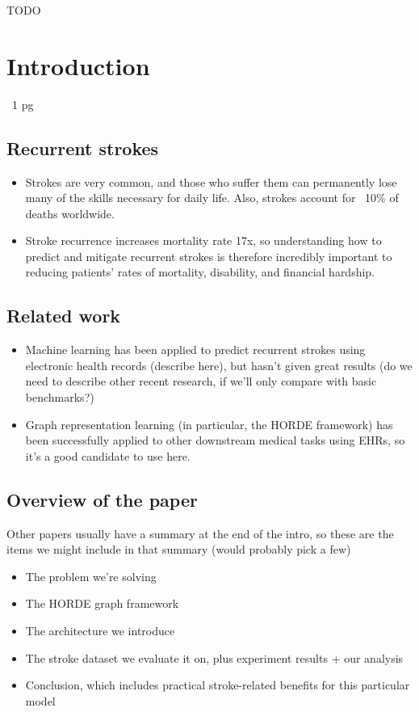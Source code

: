 \documentclass[conference]{IEEEtran}
\begin{document}
\begin{IEEEkeywords}
TODO
\end{IEEEkeywords}

\section{Introduction}
~1 pg
\subsection{Recurrent strokes}
\begin{itemize}
    \item Strokes are very common, and those who suffer them can permanently lose many of the skills necessary for daily life. Also, strokes account for ~10\% of deaths worldwide.
    \item Stroke recurrence increases mortality rate 17x, so understanding how to predict and mitigate recurrent strokes is therefore incredibly important to reducing patients' rates of mortality, disability, and financial hardship.
\end{itemize}

\subsection{Related work}
\begin{itemize}
    \item Machine learning has been applied to predict recurrent strokes using electronic health records (describe here), but hasn't given great results {\color{red}(do we need to describe other recent research, if we'll only compare with basic benchmarks?})
    \item Graph representation learning (in particular, the HORDE framework) has been successfully applied to other downstream medical tasks using EHRs, so it's a good candidate to use here.
\end{itemize}

\subsection{Overview of the paper}
{\color{red}Other papers usually have a summary at the end of the intro, so these are the items we might include in that summary (would probably pick a few)}
\begin{itemize}
    \item The problem we're solving
    \item The HORDE graph framework
    \item The architecture we introduce
    \item The stroke dataset we evaluate it on, plus experiment results + our analysis
    \item Conclusion, which includes practical stroke-related benefits for this particular model
\end{itemize}
\end{document}
